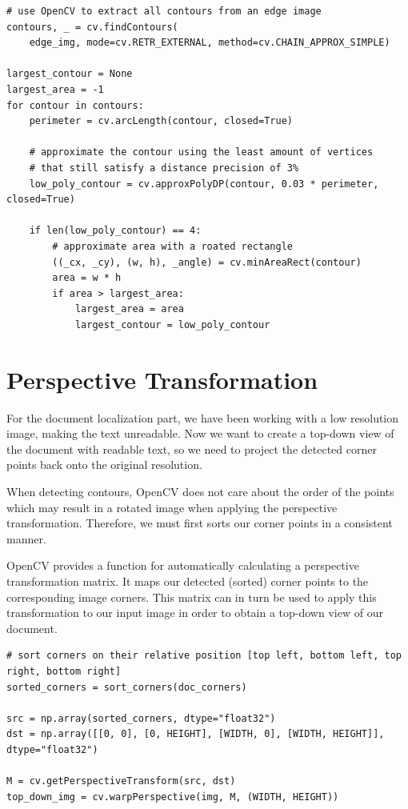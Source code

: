 \documentclass[bibliography=totoc]{scrartcl}
\begin{document}
\lstset{language=Python}
\lstset{frame=lines}
\lstset{basicstyle=\footnotesize}
\begin{lstlisting}
# use OpenCV to extract all contours from an edge image
contours, _ = cv.findContours(
	edge_img, mode=cv.RETR_EXTERNAL, method=cv.CHAIN_APPROX_SIMPLE)

largest_contour = None
largest_area = -1
for contour in contours:
	perimeter = cv.arcLength(contour, closed=True)
	
	# approximate the contour using the least amount of vertices 
	# that still satisfy a distance precision of 3%
	low_poly_contour = cv.approxPolyDP(contour, 0.03 * perimeter, closed=True)

	if len(low_poly_contour) == 4:
		# approximate area with a roated rectangle
		((_cx, _cy), (w, h), _angle) = cv.minAreaRect(contour)
		area = w * h
		if area > largest_area:
			largest_area = area
			largest_contour = low_poly_contour
	\end{lstlisting}


\section{Perspective Transformation}
For the document localization part, we have been working with a low resolution image, making the text unreadable.
Now we want to create a top-down view of the document with readable text, so we need to project the detected corner points back onto the original resolution.

When detecting contours, OpenCV does not care about the order of the points which may result in a rotated image when applying the perspective transformation.
Therefore, we must first sorts our corner points in a consistent manner.

OpenCV provides a function for automatically calculating a perspective transformation matrix.
It maps our detected (sorted) corner points to the corresponding image corners.
This matrix can in turn be used to apply this transformation to our input image in order to obtain a top-down view of our document.\\

\lstset{language=Python}
\lstset{frame=lines}
\lstset{basicstyle=\footnotesize}
\begin{lstlisting}
# sort corners on their relative position [top left, bottom left, top right, bottom right]
sorted_corners = sort_corners(doc_corners)

src = np.array(sorted_corners, dtype="float32")
dst = np.array([[0, 0], [0, HEIGHT], [WIDTH, 0], [WIDTH, HEIGHT]], dtype="float32")

M = cv.getPerspectiveTransform(src, dst)
top_down_img = cv.warpPerspective(img, M, (WIDTH, HEIGHT))
	\end{lstlisting}
\end{document}
